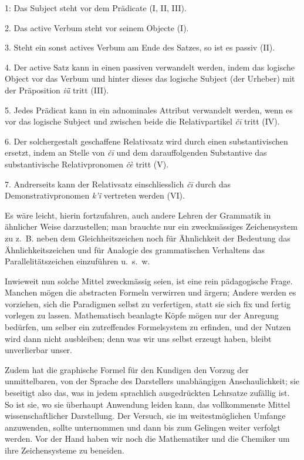 1: Das Subject steht vor dem Prädicate (I, II, III).

\label{fp.125}

2. Das active Verbum steht vor seinem Objecte (I).

3. Steht ein sonst actives Verbum am Ende des Satzes, so ist es passiv (II).

4. Der active Satz kann in einen passiven verwandelt werden, indem das logische Object vor das Verbum und hinter dieses das logische Subject (der Urheber) mit der Präposition \textit{iǖ} tritt (III).

5. Jedes Prädicat kann in ein adnominales Attribut verwandelt werden, wenn es vor das logische Subject und zwischen beide die Relativpartikel \textit{čī} tritt (IV).

6. Der solchergestalt geschaffene Relativsatz wird durch einen substantivischen ersetzt, indem an Stelle von \textit{čī} und dem darauffolgenden Substantive das substantivische Relativpronomen \textit{čè} tritt (V).

7. Andrerseits kann der Relativsatz einschliesslich \textit{čī} durch das Demonstrativpronomen \textit{k’î} vertreten werden (VI).

Es wäre leicht, hierin fortzufahren, auch andere Lehren der Grammatik in ähnlicher Weise darzustellen; man brauchte nur ein zweckmässiges Zeichensystem zu  z.~B. neben dem Gleichheitszeichen noch für Ähnlichkeit der Bedeutung das Ähnlichkeitszeichen und für Analogie des grammatischen Verhaltens das Parallelitätszeichen einzuführen u.~s.~w. 

Inwieweit nun solche Mittel zweckmässig seien, ist eine rein pädagogische \label{sp.119} Frage. Manchen mögen die abstracten Formeln verwirren und ärgern; Andere werden es vorziehen, sich die Paradigmen selbst zu verfertigen, statt sie sich fix und fertig vorlegen zu lassen. Mathematisch beanlagte Köpfe mögen nur der Anregung bedürfen, um selber ein zutreffendes Formelsystem zu erfinden, und der Nutzen wird dann nicht ausbleiben; denn was wir uns selbst erzeugt haben, bleibt unverlierbar unser.

Zudem hat die graphische Formel für den Kundigen den Vorzug der unmittelbaren, von der Sprache des Darstellers unabhängigen Anschaulichkeit; sie beseitigt also das, was in jedem sprachlich ausgedrückten Lehrsatze zufällig ist. So ist sie, wo sie überhaupt Anwendung leiden kann, das vollkommenste Mittel wissenschaftlicher Darstellung. Der Versuch, sie im weitestmöglichen Umfange anzuwenden, sollte unternommen und dann bis zum Gelingen weiter verfolgt werden. Vor der Hand haben wir noch die Mathematiker und die Chemiker um ihre Zeichensysteme zu beneiden.

